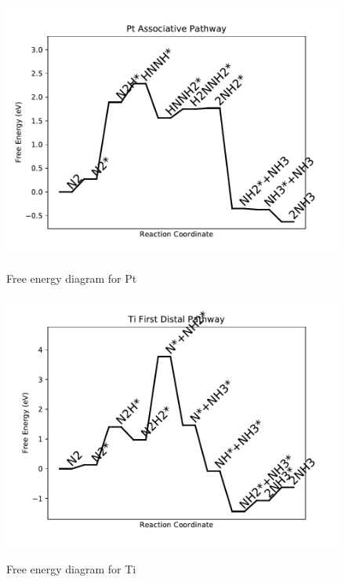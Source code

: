 \documentclass{article}
\begin{document}
\begin{figure}
\includegraphics[width=1\linewidth]{data/plots/Pt_associative.pdf}
\label{fig:Pt_associative}
\caption{Free energy diagram for Pt}
\end{figure}

\clearpage
\begin{figure}
\includegraphics[width=1\linewidth]{data/plots/Ti_distal_1.pdf}
\label{fig:Ti_distal_1}
\caption{Free energy diagram for Ti}
\end{figure}
\end{document}
